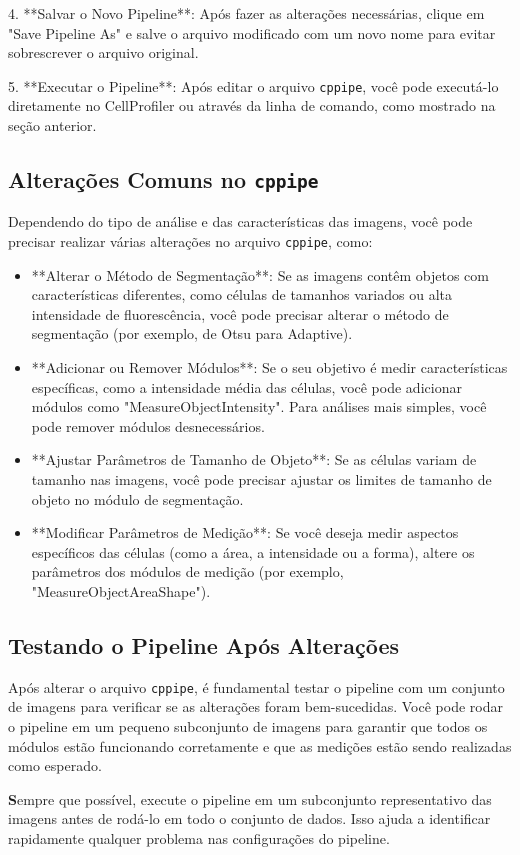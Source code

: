 \documentclass[a4paper, 12pt]{article}
\begin{document}
4. **Salvar o Novo Pipeline**:
   Após fazer as alterações necessárias, clique em "Save Pipeline As" e salve o arquivo modificado com um novo nome para evitar sobrescrever o arquivo original.

5. **Executar o Pipeline**:
   Após editar o arquivo \texttt{cppipe}, você pode executá-lo diretamente no CellProfiler ou através da linha de comando, como mostrado na seção anterior.


\subsection{Alterações Comuns no \texttt{cppipe}}

Dependendo do tipo de análise e das características das imagens, você pode precisar realizar várias alterações no arquivo \texttt{cppipe}, como:

\begin{itemize}
  \item **Alterar o Método de Segmentação**: Se as imagens contêm objetos com características diferentes, como células de tamanhos variados ou alta intensidade de fluorescência, você pode precisar alterar o método de segmentação (por exemplo, de Otsu para Adaptive).
  \item **Adicionar ou Remover Módulos**: Se o seu objetivo é medir características específicas, como a intensidade média das células, você pode adicionar módulos como "MeasureObjectIntensity". Para análises mais simples, você pode remover módulos desnecessários.
  \item **Ajustar Parâmetros de Tamanho de Objeto**: Se as células variam de tamanho nas imagens, você pode precisar ajustar os limites de tamanho de objeto no módulo de segmentação.
  \item **Modificar Parâmetros de Medição**: Se você deseja medir aspectos específicos das células (como a área, a intensidade ou a forma), altere os parâmetros dos módulos de medição (por exemplo, "MeasureObjectAreaShape").
\end{itemize}

\subsection{Testando o Pipeline Após Alterações}

Após alterar o arquivo \texttt{cppipe}, é fundamental testar o pipeline com um conjunto de imagens para verificar se as alterações foram bem-sucedidas. Você pode rodar o pipeline em um pequeno subconjunto de imagens para garantir que todos os módulos estão funcionando corretamente e que as medições estão sendo realizadas como esperado.

\textbf Sempre que possível, execute o pipeline em um subconjunto representativo das imagens antes de rodá-lo em todo o conjunto de dados. Isso ajuda a identificar rapidamente qualquer problema nas configurações do pipeline.
\end{document}
